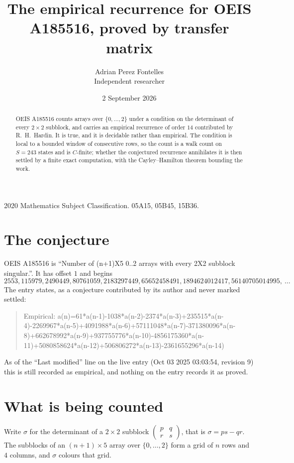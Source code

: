 \documentclass[11pt,a4paper]{article}
\title{The empirical recurrence for OEIS A185516, proved by transfer matrix}
\author{Adrian Perez Fontelles\\ \small Independent researcher}
\date{2 September 2026}
\theoremstyle{plain}
\theoremstyle{definition}
\begin{document}
\maketitle

\begin{abstract}
OEIS A185516 counts arrays over $\{0,\dots,2\}$ under a condition on the determinant of every
$2\times2$ subblock, and carries an empirical recurrence of order $14$ contributed by
R.~H.~Hardin. It is true, and it is decidable rather than empirical. The condition is local to
a bounded window of consecutive rows, so the count is a walk count on $S=243$ states and is
$C$-finite; whether the conjectured recurrence annihilates it is then settled by a finite exact
computation, with the Cayley--Hamilton theorem bounding the work.
\end{abstract}

\noindent\small 2020 Mathematics Subject Classification. 05A15, 05B45, 15B36.\normalsize

\section{The conjecture}

OEIS A185516 is ``Number of (n+1)X5 0..2 arrays with every 2X2 subblock singular.''. It has offset $1$ and begins
\[
2553, 115979, 2490449, 80761059, 2183297449, 65652458491, 1894624012417, 56140705014995,\ \dots
\]
The entry states, as a conjecture contributed by its author and never marked settled:
\begin{quote}
Empirical: a(n)=61*a(n-1)-1038*a(n-2)-2374*a(n-3)+235515*a(n-4)-2269967*a(n-5)+4091988*a(n-6)+57111048*a(n-7)-371380096*a(n-8)+662678992*a(n-9)+937755776*a(n-10)-4856175360*a(n-11)+5080858624*a(n-12)+506806272*a(n-13)-2361655296*a(n-14)
\end{quote}
As of the ``Last modified'' line on the live entry (Oct 03 2025 03:03:54, revision 9) this is still
recorded as empirical, and nothing on the entry records it as proved.

\section{What is being counted}

Write $\sigma$ for the determinant of a $2\times2$ subblock
$\begin{pmatrix}p&q\\r&s\end{pmatrix}$, that is $\sigma=ps-qr$. The subblocks of an
$(n+1)\times5$ array over $\{0,\dots,2\}$ form a grid of $n$ rows and $4$
columns, and $\sigma$ colours that grid.
\end{document}
